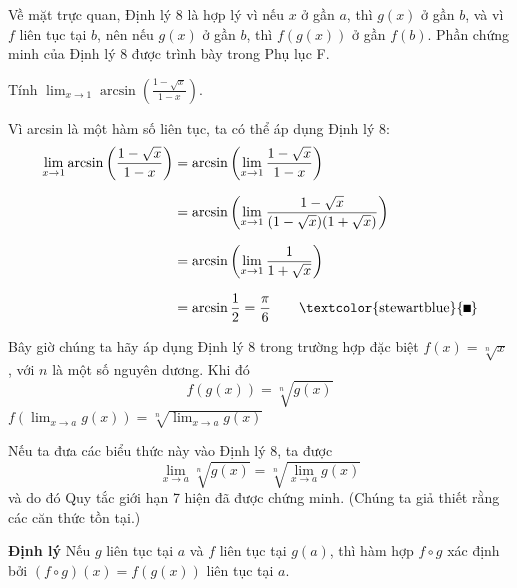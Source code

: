 \noindent
Về mặt trực quan, Định lý 8 là hợp lý vì nếu $x$ ở gần $a$, thì $g(x)$ ở gần $b$, và vì $f$ liên tục tại $b$, nên nếu $g(x)$ ở gần $b$, thì $f(g(x))$ ở gần $f(b)$. Phần chứng minh của Định lý 8 được trình bày trong Phụ lục F.

\vspace{14pt}

\quad Tính $\displaystyle \lim_{x \to 1} \arcsin\left(\frac{1 - \sqrt{x}}{1 - x}\right)$.

\vspace{8pt}

\quad Vì arcsin là một hàm số liên tục, ta có thể áp dụng Định lý 8:
\begin{align*}
\lim_{x \to 1} \arcsin\left(\frac{1 - \sqrt{x}}{1 - x}\right) 
&= \arcsin\left( \lim_{x \to 1} \frac{1 - \sqrt{x}}{1 - x} \right) \\[7pt]
&= \arcsin\left( \lim_{x \to 1} \frac{1 - \sqrt{x}}{(1 - \sqrt{x})(1 + \sqrt{x})} \right) \\[7pt]
&= \arcsin\left( \lim_{x \to 1} \frac{1}{1 + \sqrt{x}} \right) \\[7pt]
&= \arcsin \frac{1}{2} = \frac{\pi}{6} \tag*{\textcolor{stewartblue}{\rule{1.2ex}{1.2ex}}}
\end{align*}

\indent
Bây giờ chúng ta hãy áp dụng Định lý 8 trong trường hợp đặc biệt $f(x) = \sqrt[n]{x}$, với $n$ là một số nguyên dương. Khi đó
\[
f(g(x)) = \sqrt[n]{g(x)}
\]
\noindent{}\hfill $\displaystyle f\left(\lim_{x \to a} g(x)\right) = \sqrt[n]{\lim_{x \to a} g(x)}$ \hfill\mbox{}\par
\vspace{6pt}
\noindent
Nếu ta đưa các biểu thức này vào Định lý 8, ta được
\[
\lim_{x \to a} \sqrt[n]{g(x)} = \sqrt[n]{\lim_{x \to a} g(x)}
\]
và do đó Quy tắc giới hạn 7 hiện đã được chứng minh. (Chúng ta giả thiết rằng các căn thức tồn tại.)

\vspace{14pt}

\begin{tcolorbox}[
    colback=white,
    colframe=stewartred,
    boxrule=0.8pt,
    sharp corners,
    boxsep=0pt,
    top=7pt,
    bottom=7pt,
    left=8pt,
    right=8pt
]
{\fboxrule=0.8pt\fboxsep=2.5pt\textcolor{stewartred}{}}\;\; {\bfseries\color{stewartred}Định lý}\quad 
Nếu $g$ liên tục tại $a$ và $f$ liên tục tại $g(a)$, thì hàm hợp $f \circ g$ xác định bởi $(f \circ g)(x) = f(g(x))$ liên tục tại $a$.
\end{tcolorbox}

